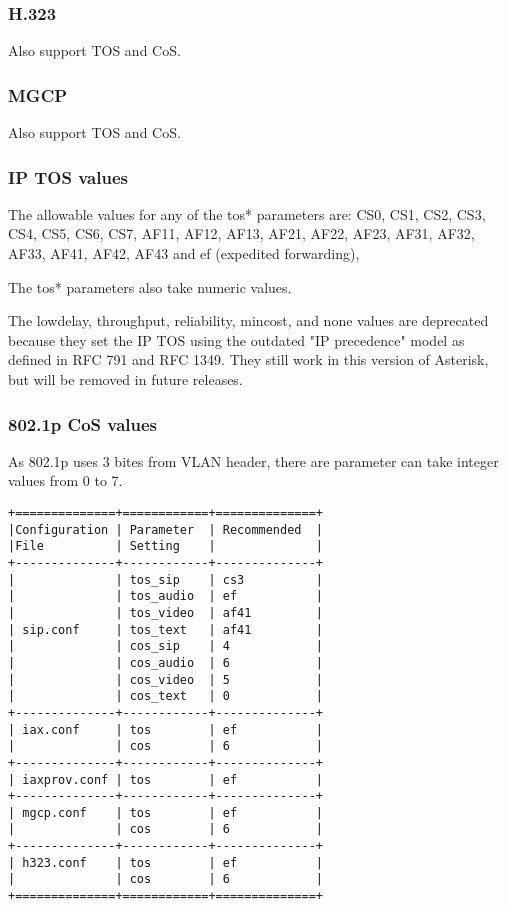 \subsubsection{H.323}
Also support TOS and CoS. 

\subsubsection{MGCP}
Also support TOS and CoS.

\subsubsection{IP TOS values}

The allowable values for any of the tos* parameters are:
CS0, CS1, CS2, CS3, CS4, CS5, CS6, CS7, AF11, AF12, AF13,
AF21, AF22, AF23, AF31, AF32, AF33, AF41, AF42, AF43 and
ef (expedited forwarding),

The tos* parameters also take numeric values.

The lowdelay, throughput, reliability, mincost, and none values are
deprecated because they set the IP TOS using the outdated "IP
precedence" model as defined in RFC 791 and RFC 1349. They still
work in this version of Asterisk, but will be removed in future releases.

\subsubsection{802.1p CoS values}

As 802.1p uses 3 bites from VLAN header, there are parameter can take 
integer values from 0 to 7.


\begin{verbatim}
+==============+============+==============+
|Configuration | Parameter  | Recommended  |
|File          | Setting    |              |
+--------------+------------+--------------+
|              | tos_sip    | cs3          |
|              | tos_audio  | ef           |
|              | tos_video  | af41         |
| sip.conf     | tos_text   | af41         |
|              | cos_sip    | 4            |
|              | cos_audio  | 6            |
|              | cos_video  | 5            |
|              | cos_text   | 0            |
+--------------+------------+--------------+
| iax.conf     | tos        | ef           |
|              | cos        | 6            |
+--------------+------------+--------------+
| iaxprov.conf | tos        | ef           |
+--------------+------------+--------------+
| mgcp.conf    | tos        | ef           |
|              | cos        | 6            |
+--------------+------------+--------------+
| h323.conf    | tos        | ef           |
|              | cos        | 6            |
+==============+============+==============+
\end{verbatim}

